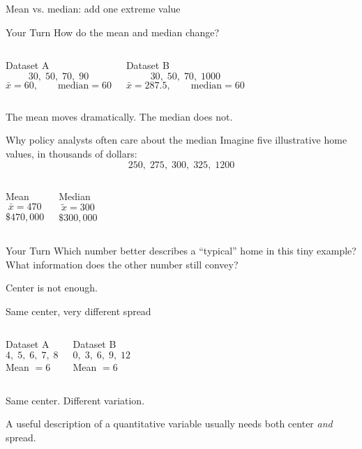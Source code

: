 \documentclass[11pt,aspectratio=169]{beamer}
\newcommand{\yourturn}[1]{%
\begin{center}
\begin{minipage}{0.90\textwidth}
\begin{alertblock}{Your Turn}
#1
\end{alertblock}
\end{minipage}
\end{center}}
\begin{document}
\begin{frame}{Mean vs. median: add one extreme value}
\yourturn{How do the mean and median change?}

\begin{columns}[T,onlytextwidth]
\begin{block}{Dataset A}
\[
30,\;50,\;70,\;90
\]
\[
\bar{x}=60,\qquad \text{median}=60
\]
\end{block}
\begin{block}{Dataset B}
\[
30,\;50,\;70,\;1000
\]
\[
\bar{x}=287.5,\qquad \text{median}=60
\]
\end{block}
\end{columns}

\vfill
\alert{The mean moves dramatically. The median does not.}
\end{frame}

\begin{frame}{Why policy analysts often care about the median}
Imagine five illustrative home values, in thousands of dollars:
\[
250,\;275,\;300,\;325,\;1200
\]

\begin{columns}[T,onlytextwidth]
\begin{block}{Mean}
\[
\bar{x}=470
\]
$\$470{,}000$
\end{block}
\begin{block}{Median}
\[
\tilde{x}=300
\]
$\$300{,}000$
\end{block}
\end{columns}

\vfill
\yourturn{Which number better describes a ``typical'' home in this tiny example? What information does the other number still convey?}
\end{frame}

\begin{frame}[standout]
\Large Center is not enough.
\end{frame}

\begin{frame}{Same center, very different spread}
\begin{columns}[T,onlytextwidth]
\begin{block}{Dataset A}
\[
4,\;5,\;6,\;7,\;8
\]
Mean $=6$
\end{block}
\begin{block}{Dataset B}
\[
0,\;3,\;6,\;9,\;12
\]
Mean $=6$
\end{block}
\end{columns}

\vspace{0.8em}
\begin{center}
\Large Same center. \alert{Different variation.}
\end{center}

\vfill
A useful description of a quantitative variable usually needs both center \emph{and} spread.
\end{frame}
\end{document}
